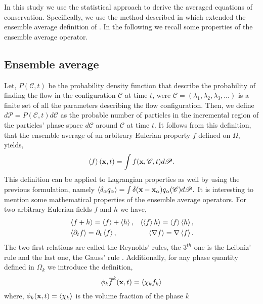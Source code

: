 In this study we use the statistical approach to derive the averaged equations of conservation. 
Specifically, we use the method described in \citet{zhang2021ensemble} which extended the ensemble average definition of \citet{batchelor1972sedimentation}. 
In the following we recall some properties of the ensemble average operator. 

\subsection{Ensemble average}

Let, $P(\mathscr{C},t)$ be the probability density function that describe the probability of finding the flow in the configuration $\mathscr{C}$ at time $t$, were $\mathscr{C} = (\lambda_1,\lambda_2,\lambda_3,\ldots)$ is a finite set of all the parameters describing the flow configuration. 
Then, we define $d\mathscr{P} = P(\mathscr{C},t)d\mathscr{C}$ as the probable number of particles in the incremental region of the particles' phase space $d\mathscr{C}$ around $\mathscr{C}$ at time $t$. 
It follows from this definition, that the ensemble average of an arbitrary Eulerian property $f$ defined on $\Omega$, yields,
\begin{equation}
    \left<f\right>(\textbf{x},t)
    =\int f(\textbf{x},\mathscr{C},t) d\mathscr{P}. 
    \label{eq:avg}
\end{equation}  
This definition can be applied to Lagrangian properties as well by using the previous formulation, namely $\left<\delta_\alpha q_\alpha\right> = \int \delta(\textbf{x} - \textbf{x}_\alpha) q_\alpha(\mathscr{C}) d\mathscr{P}. $
It is interesting to mention some mathematical properties of the ensemble average operators. 
For two arbitrary Eulerian fields $f$ and $h$ we have,
\begin{align}
    &\left<f+h\right> = \left<f\right>+\left<h\right>, 
    &\left<\left<f\right>h\right> = \left<f\right>\left<h\right>, \nonumber \\
    &\left<\partial_t f\right> 
    = \partial_t\left<f\right>, 
    &\left<\mathbf{\nabla} f\right>
    = \mathbf{\nabla} \left<f\right>. 
    \label{eq:avg_properties}
\end{align}
The two first relations are called the Reynolds' rules, the $3^{th}$ one is the Leibniz' 
rule and the last one, the Gauss' rule \citep{drew1983mathematical}.
Additionally, for any phase quantity defined in $\Omega_k$ we introduce the definition, 
\begin{equation}
    \phi_k\overline{f}^k(\textbf{x},t) = \left<\chi_k f_k\right>
    \label{eq:1_avg}
\end{equation}
where, $\phi_k(\textbf{x},t) = \left<\chi_k\right>$ is the volume fraction of the phase $k$

